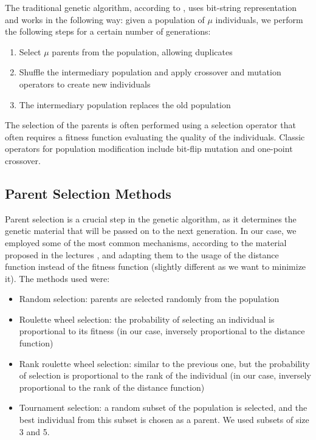 \documentclass[12pt]{article}
\begin{document}
The traditional genetic algorithm, according to \cite{Eiben2003}, uses bit-string representation and works in the following way:
given a population of $\mu$ individuals, we perform the following steps for a certain number of generations:
\begin{enumerate}
    \item Select $\mu$ parents from the population, allowing duplicates
    \item Shuffle the intermediary population and apply crossover and mutation operators to create new individuals
    \item The intermediary population replaces the old population
\end{enumerate}

The selection of the parents is often performed using a selection operator that often requires a fitness function evaluating the quality of the individuals. Classic operators for population modification include bit-flip mutation and one-point crossover.

\subsection{Parent Selection Methods}
Parent selection is a crucial step in the genetic algorithm, as it determines the genetic material that will be passed on to the next generation. In our case, we employed some of the most common mechanisms, according to the material proposed in the lectures \cite{Belanche2024}, and adapting them to the usage of the distance function instead of the fitness function (slightly different as we want to minimize it). The methods used were:
\begin{itemize}
    \item Random selection: parents are selected randomly from the population
    \item Roulette wheel selection: the probability of selecting an individual is proportional to its fitness (in our case, inversely proportional to the distance function)
    \item Rank roulette wheel selection: similar to the previous one, but the probability of selection is proportional to the rank of the individual (in our case, inversely proportional to the rank of the distance function)
    \item Tournament selection: a random subset of the population is selected, and the best individual from this subset is chosen as a parent. We used subsets of size 3 and 5.
\end{itemize}
\end{document}

